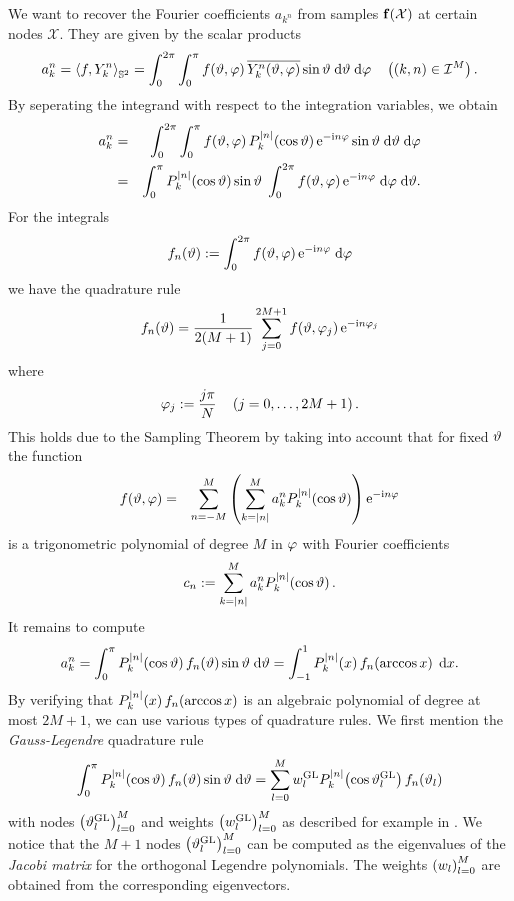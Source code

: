 We want to recover the Fourier coefficients $a_{k^n}$ from samples $\mathbf{f}{\hspace{-0.4ex}}\left(\mathcal{X}\right)$ at certain nodes $\mathcal{X}$. They 
are given by the scalar products
\[
  a_{k}^n = \left<f,Y_{k}^n\right>_{\mathbb{S}^2} = \int_{0}^{2\pi} \int_{0}^{\pi} f{\hspace{-0.4ex}}\left(\vartheta,\varphi\right) \overline{Y_{k}^n{\hspace{-0.4ex}}\left(\vartheta,\varphi\right)} \sin \vartheta \; \text{\rm{d}} \vartheta \; \text{\rm{d}} \varphi \quad \left(\left(k,n\right) \in \mathcal{I}^M\right).
\]
By seperating the integrand with respect to the integration variables, we obtain
\begin{eqnarray*}
  a_{k}^n & = & \int_{0}^{2\pi} \int_{0}^{\pi} f{\hspace{-0.4ex}}\left(\vartheta,\varphi\right) P_{k}^{\left\vert n\right\vert}{\hspace{-0.4ex}}\left(\cos \vartheta\right) \mbox{\rm{e}}^{-\mbox{\scriptsize\rm{i}} n \varphi} \sin \vartheta \; \text{\rm{d}} \vartheta \; \text{\rm{d}} \varphi\\
          & = & \int_{0}^{\pi} P_{k}^{\left\vert n\right\vert}{\hspace{-0.4ex}}\left(\cos \vartheta\right) \sin \vartheta \; \int_{0}^{2\pi} f{\hspace{-0.4ex}}\left(\vartheta,\varphi\right) \mbox{\rm{e}}^{-\mbox{\scriptsize\rm{i}} n \varphi} \; \text{\rm{d}} \varphi \; \text{\rm{d}} \vartheta.
\end{eqnarray*}
For the integrals
\[
  f_{n}{\hspace{-0.4ex}}\left(\vartheta\right) := \int_{0}^{2\pi} f{\hspace{-0.4ex}}\left(\vartheta,\varphi\right) \mbox{\rm{e}}^{-\mbox{\scriptsize\rm{i}} n \varphi} \; \text{\rm{d}} \varphi
\]
we have the quadrature rule
\[ f_{n}{\hspace{-0.4ex}}\left(\vartheta\right) = \frac{1}{2(M+1)} \sum_{j=0}^{2M+1} f{\hspace{-0.4ex}}\left(\vartheta,\varphi_{j}\right) \mbox{\rm{e}}^{-\mbox{\scriptsize\rm{i}} n \varphi_{j}}\]
where
\[ \varphi_{j} := \frac{j\pi}{N} \quad \left(j=0,\ldots,2M+1\right). \]
This holds due to the Sampling Theorem by taking into account that for fixed $\vartheta$ the function
\begin{eqnarray*}
  f{\hspace{-0.4ex}}\left(\vartheta,\varphi\right) & = & \sum_{n=-M}^{M} \left(\sum_{k=\left\vert n\right\vert}^M a_{k}^n P_{k}^{\left\vert n\right\vert}{\hspace{-0.4ex}}\left(\cos \vartheta\right)\right) \mbox{\rm{e}}^{-\mbox{\scriptsize\rm{i}} n \varphi}\\
\end{eqnarray*}
is a trigonometric polynomial of degree $M$ in $\varphi$ with Fourier coefficients
\[
  c_{n} := \sum_{k=\left\vert n\right\vert}^M a_{k}^n P_{k}^{\left\vert n\right\vert}{\hspace{-0.4ex}}\left(\cos \vartheta\right).
\]
It remains to compute
\[
  a_{k}^n = \int_{0}^{\pi} P_{k}^{\left\vert n\right\vert}{\hspace{-0.4ex}}\left(\cos \vartheta\right) f_{n}{\hspace{-0.4ex}}\left(\vartheta\right) \sin \vartheta \; \text{\rm{d}} \vartheta = 
  \int_{-1}^1 P_{k}^{\left\vert n\right\vert}{\hspace{-0.4ex}}\left(x\right) f_{n}{\hspace{-0.4ex}}\left(\arccos x\right) \; \text{\rm{d}} x.
\]
By verifying that $P_{k}^{\left\vert n\right\vert}{\hspace{-0.4ex}}\left(x\right) f_{n}{\hspace{-0.4ex}}\left(\arccos x\right)$ is an algebraic polynomial of degree at most $2M+1$, 
we can use various types of quadrature rules. We first mention the \emph{Gauss-Legendre} quadrature rule
\[
  \int_{0}^{\pi} P_{k}^{\left\vert n\right\vert}{\hspace{-0.4ex}}\left(\cos \vartheta\right) f_{n}{\hspace{-0.4ex}}\left(\vartheta\right) \sin \vartheta \; \text{\rm{d}} \vartheta = \sum_{l=0}^{M} w_{l}^{\mbox{\scriptsize\rm{GL}}} P_{k}^{\left\vert n\right\vert}{\hspace{-0.4ex}}\left(\cos \vartheta_{l}^{\mbox{\scriptsize\rm{GL}}}\right) f_{n}{\hspace{-0.4ex}}\left(\vartheta_{l}\right) 
\]
with nodes $\left(\vartheta_{l}^{\mbox{\scriptsize\rm{GL}}}\right)_{l=0}^M$ and weights $\left(w_{l}^{\mbox{\scriptsize\rm{GL}}}\right)_{l=0}^M$ as described for example in \cite{boehme02}. 
We notice that the $M+1$ nodes $\left(\vartheta_{l}^{\mbox{\scriptsize\rm{GL}}}\right)_{l=0}^{M}$ can be computed as the eigenvalues of the \emph{Jacobi matrix} for the orthogonal 
Legendre polynomials. The weights $\left(w_{l}\right)_{l=0}^{M}$ are obtained from the corresponding eigenvectors.

